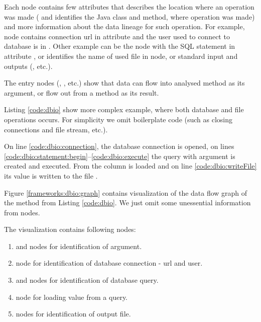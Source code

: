 Each node contains few attributes that describes the location where an operation was made
( and  identifies the Java class and method, where operation was made)
and more information about the data lineage for such operation.
For example,  node contains connection url in 
attribute and the user used to connect to database is in .
Other example can be the  node with the SQL statement in attribute ,
or  identifies the name of used file in  node,
or standard input and outputs (, etc.).

The entry nodes (, , etc.) show that data can flow
into analysed method as its argument, or flow out from a method as its result.

Listing \ref{code:dbio} show more complex example, where both database and file
operations occurs. For simplicity we omit boilerplate code (such as closing connections and file stream, etc.).

On line \ref{code:dbio:connection}, the database connection is opened,
on lines \ref{code:dbio:statement:begin}--\ref{code:dbio:execute} the query
with  argument is created and executed. From  the 
column is loaded and on line \ref{code:dbio:writeFile} its value is written to the file .


Figure \ref{frameworks:dbio:graph} contains visualization of the data flow graph
of the method  from Listing \ref{code:dbio}.
We just omit some unessential information from nodes.

The visualization contains following nodes:
\begin{enumerate}
  \item {} and  nodes for identification of  argument.
  \item {} node for identification of database connection - url and user.
  \item {} and  nodes for identification of database query.
  \item {} node for loading value from a query.
  \item {} nodes for identification of output file.
\end{enumerate}

